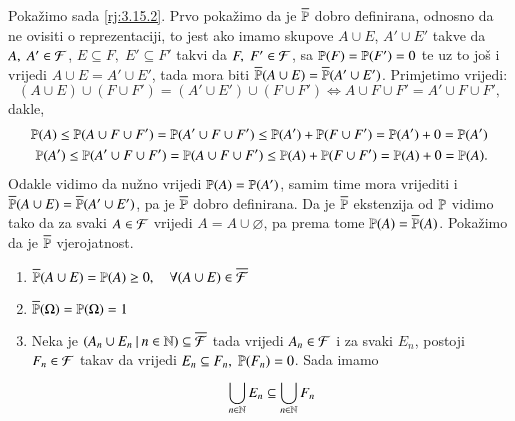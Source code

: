 \begin{rj}
    Poka\v zimo sada \ref{rj:3.15.2}.
    Prvo poka\v zimo da je $\overline{\mathbb{P}}$ dobro definirana, odnosno da ne ovisiti o reprezentaciji, to jest ako imamo skupove $A \cup E$, $A' \cup E'$ takve da $A, \; A' \in \mathcal{F}$, $E \subseteq F, \; E' \subseteq F'$ takvi da $F, \; F' \in \mathcal{F}$, sa $\mathbb{P}({F}) = \mathbb{P}({F'}) = 0$ te uz to jo\v s i vrijedi $A \cup E = A' \cup E'$, tada mora biti $\overline{\mathbb{P}} (A \cup E) = \overline{\mathbb{P}} (A' \cup E')$.
    Primjetimo vrijedi:
    \begin{equation*}
        (A \cup E) \cup (F \cup F') = (A' \cup E') \cup (F \cup F') \iff A \cup F \cup F' = A' \cup F \cup F',
    \end{equation*}
    dakle,
    \begin{equation*}
        \begin{aligned}
            \mathbb{P}({A}) \leq \mathbb{P}({A \cup F \cup F'}) = \mathbb{P}({A' \cup F \cup F'}) \leq \mathbb{P}({A'}) + \mathbb{P}({F \cup F'}) = \mathbb{P}({A'}) + 0 = \mathbb{P}({A'})\\
            \mathbb{P}({A'}) \leq \mathbb{P}({A' \cup F \cup F'}) = \mathbb{P}({A \cup F \cup F'}) \leq \mathbb{P}({A}) + \mathbb{P}({F \cup F'}) = \mathbb{P}({A}) + 0 = \mathbb{P}({A}).
        \end{aligned}
    \end{equation*}
    Odakle vidimo da nu\v zno vrijedi $\mathbb{P}({A}) = \mathbb{P}({A'})$, samim time mora vrijediti i $\overline{\mathbb{P}} (A \cup E) = \overline{\mathbb{P}} (A' \cup E')$, pa je $\overline{\mathbb{P}}$ dobro definirana.
    Da je $\overline{\mathbb{P}}$ ekstenzija od $\mathbb{P}$ vidimo tako da za svaki $A \in \mathcal{F}$ vrijedi $A = A \cup \varnothing$, pa prema tome $\mathbb{P}({A}) = \overline{\mathbb{P}} (A)$.
    Poka\v zimo da je $\overline{\mathbb{P}}$ vjerojatnost.
    \begin{enumerate}[label=(\roman*)]
        \item $\overline{\mathbb{P}} (A \cup E) = \mathbb{P}({A}) \geq 0, \quad \forall (A \cup E) \in \overline{\mathcal{F}}$
        \item $\overline{\mathbb{P}} (\Omega) = \mathbb{P}({\Omega}) = 1$
        \item Neka je $({A_n \cup E_n} \: | \: {n \in \mathbb{N}}) \subseteq \overline{\mathcal{F}}$ tada vrijedi $A_n \in \mathcal{F}$ i za svaki $E_n$, postoji $F_n \in \mathcal{F}$ takav da vrijedi $E_n \subseteq F_n, \; \mathbb{P}({F_n}) = 0$. Sada imamo
        \begin{equation}    \label{jed:3.10-1}
            \begin{aligned}
                \unija{n \in \nat}{} E_n &\subseteq \unija{n \in \nat}{} F_n\\

\end{aligned}
\end{equation}
\end{enumerate}
\end{rj}
